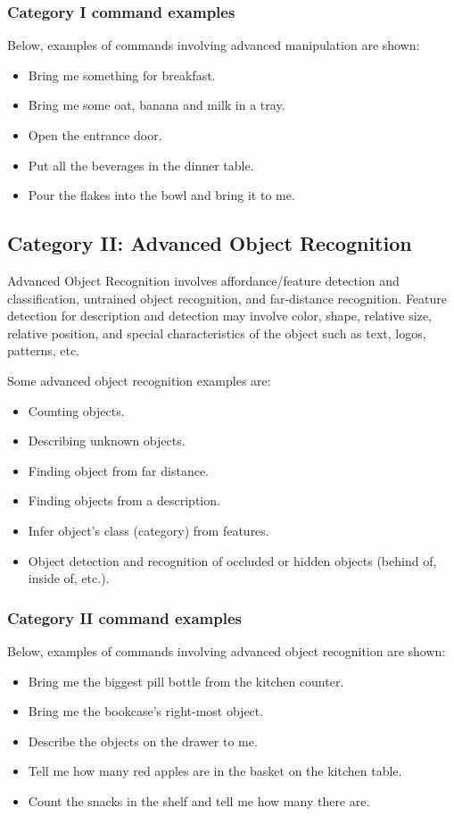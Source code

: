 \subsubsection{Category I command examples}
Below, examples of commands involving advanced manipulation are shown:
\begin{itemize}
	\item Bring me something for breakfast.
	\item Bring me some oat, banana and milk in a tray.
	\item Open the entrance door.
	\item Put all the beverages in the dinner table.
	\item Pour the flakes into the bowl and bring it to me.
\end{itemize}

%
%
\subsection{Category II: Advanced Object Recognition}
\label{sec:eegpsr-categoryII-explained}
Advanced Object Recognition involves affordance/feature detection and classification, untrained object recognition, and far-distance recognition. Feature detection for description and detection may involve color, shape, relative size, relative position, and special characteristics of the object such as text, logos, patterns, etc.

Some advanced object recognition examples are:
\begin{itemize}
	\item Counting objects.
	\item Describing unknown objects.
	\item Finding object from far distance.
	\item Finding objects from a description.
	\item Infer object's class (category) from features.
	\item Object detection and recognition of occluded or hidden objects (behind of, inside of, etc.).
\end{itemize}

\subsubsection{Category II command examples}
Below, examples of commands involving advanced object recognition are shown:
\begin{itemize}
	\item Bring me the biggest pill bottle from the kitchen counter.
	\item Bring me the bookcase's right-most object.
	\item Describe the objects on the drawer to me.
	\item Tell me how many red apples are in the basket on the kitchen table.
	\item Count the snacks in the shelf and tell me how many there are.
\end{itemize}

